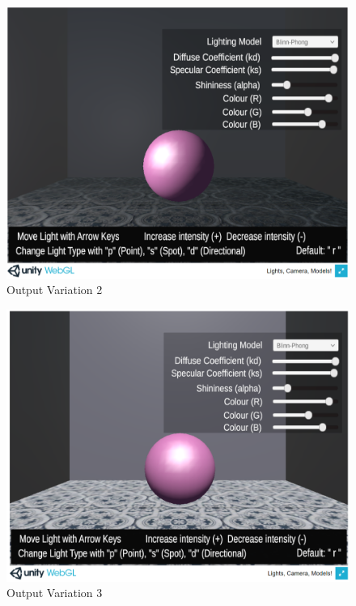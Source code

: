 \documentclass[12pt, titlepage]{article}
\begin{document}
\begin{enumerate}
	\begin{figure}[h]
		\centering
		\includegraphics[scale=0.25]{./images/fromVnVPlan/sphere-lit-point-moveValid}
		\caption{Output Variation 2}
		\label{fig:point-move}
	\end{figure}	
	
	\begin{figure}[h]
		\centering
		\includegraphics[scale=0.25]{./images/fromVnVPlan/sphere-lit-direction}
		\caption{Output Variation 3}
		\label{fig:directional-move}
	\end{figure}
	

\end{enumerate}
\end{document}
